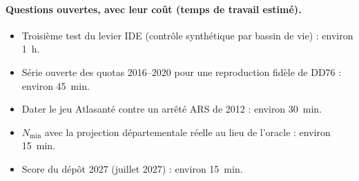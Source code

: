 \documentclass[11pt]{article}
\begin{document}
\paragraph{Questions ouvertes, avec leur coût (temps de travail estimé).}
\begin{itemize}
  \item Troisième test du levier IDE (contrôle synthétique par bassin de vie) : environ 1~h.
  \item Série ouverte des quotas 2016--2020 pour une reproduction fidèle de DD76 : environ 45~min.
  \item Dater le jeu Atlasanté contre un arrêté ARS de 2012 : environ 30~min.
  \item $N_{\min}$ avec la projection départementale réelle au lieu de l'oracle : environ 15~min.
  \item Score du dépôt 2027 (juillet 2027) : environ 15~min.
\end{itemize}



\end{document}
